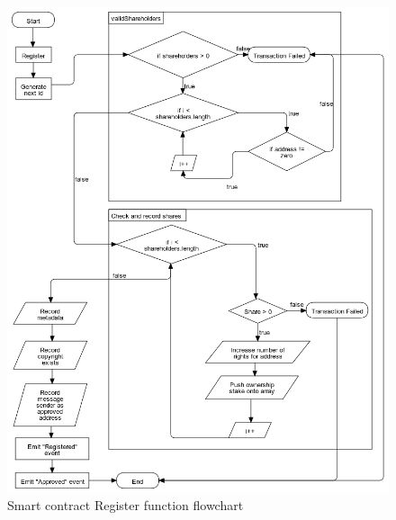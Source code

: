 \begin{figure}[H]
\caption{Smart contract Register function flowchart}
\centering
\includegraphics[width=\textwidth,height=\textheight,keepaspectratio]{images/operational/Register}
\end{figure}

